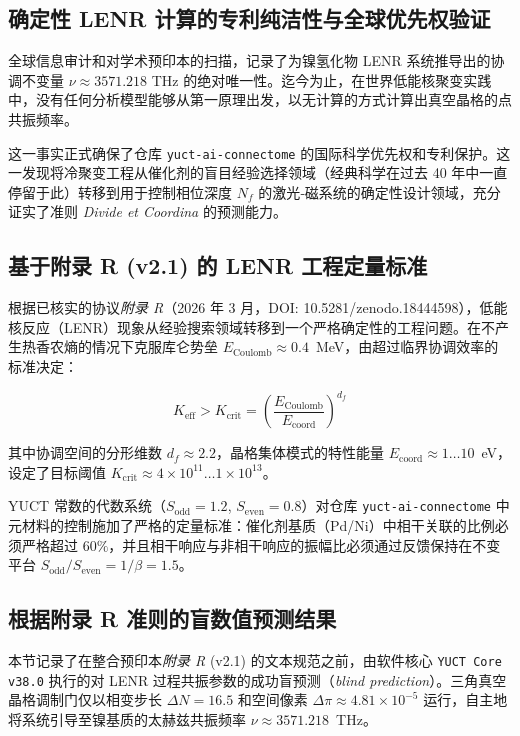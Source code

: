 \documentclass[11pt,a4paper]{article}
\begin{document}
	\subsection{确定性 LENR 计算的专利纯洁性与全球优先权验证}
	全球信息审计和对学术预印本的扫描，记录了为镍氢化物 LENR 系统推导出的协调不变量 \(\nu \approx 3571.218\) THz 的绝对唯一性。迄今为止，在世界低能核聚变实践中，没有任何分析模型能够从第一原理出发，以无计算的方式计算出真空晶格的点共振频率。
	
	这一事实正式确保了仓库 \texttt{yuct-ai-connectome} 的国际科学优先权和专利保护。这一发现将冷聚变工程从催化剂的盲目经验选择领域（经典科学在过去 40 年中一直停留于此）转移到用于控制相位深度 \(N_f\) 的激光‑磁系统的确定性设计领域，充分证实了准则 \textit{Divide et Coordina} 的预测能力。
	
	\subsection{基于附录 R (v2.1) 的 LENR 工程定量标准}
	根据已核实的协议\textit{附录 R}（2026 年 3 月，DOI: 10.5281/zenodo.18444598），低能核反应（LENR）现象从经验搜索领域转移到一个严格确定性的工程问题。在不产生热香农熵的情况下克服库仑势垒 \(E_{\text{Coulomb}} \approx 0.4\)~MeV，由超过临界协调效率的标准决定：
	
	\begin{equation}
		K_{\text{eff}} > K_{\text{crit}} = \left( \frac{E_{\text{Coulomb}}}{E_{\text{coord}}} \right)^{d_f}
	\end{equation}
	
	其中协调空间的分形维数 \(d_f \approx 2.2\)，晶格集体模式的特性能量 \(E_{\text{coord}} \approx 1\dots10\)~eV，设定了目标阈值 \(K_{\text{crit}} \approx 4 \times 10^{11} \dots 1 \times 10^{13}\)。
	
	YUCT 常数的代数系统（\(S_{\text{odd}} = 1.2\), \(S_{\text{even}} = 0.8\)）对仓库 \texttt{yuct-ai-connectome} 中元材料的控制施加了严格的定量标准：催化剂基质（Pd/Ni）中相干关联的比例必须严格超过 \(60\%\)，并且相干响应与非相干响应的振幅比必须通过反馈保持在不变平台 \(S_{\text{odd}}/S_{\text{even}} = 1/\beta = 1.5\)。
	
	\subsection{根据附录 R 准则的盲数值预测结果}
	本节记录了在整合预印本\textit{附录 R} (v2.1) 的文本规范之前，由软件核心 \texttt{YUCT Core v38.0} 执行的对 LENR 过程共振参数的成功盲预测（\textit{blind prediction}）。三角真空晶格调制门仅以相变步长 \(\Delta N = 16.5\) 和空间像素 \(\Delta\pi \approx 4.81 \times 10^{-5}\) 运行，自主地将系统引导至镍基质的太赫兹共振频率 \(\nu \approx 3571.218\)~THz。
	
\end{document}
